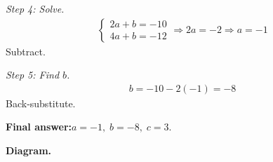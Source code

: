\documentclass[11pt]{article}
\begin{document}
\textit{Step 4: Solve.}
\[\begin{gathered}
\begin{cases} 2a + b = -10 \\ 4a + b = -12 \end{cases} \Rightarrow 2a = -2 \Rightarrow a = -1
\end{gathered}\]
Subtract.

\textit{Step 5: Find \( b \).}
\[\begin{gathered}
b = -10 - 2(-1) = -8
\end{gathered}\]
Back-substitute.

\begin{answerbox}
\textbf{Final answer:}\quad \(\displaystyle  a = -1,\; b = -8,\; c = 3 \).
\end{answerbox}
\textbf{Diagram.}
\end{document}
